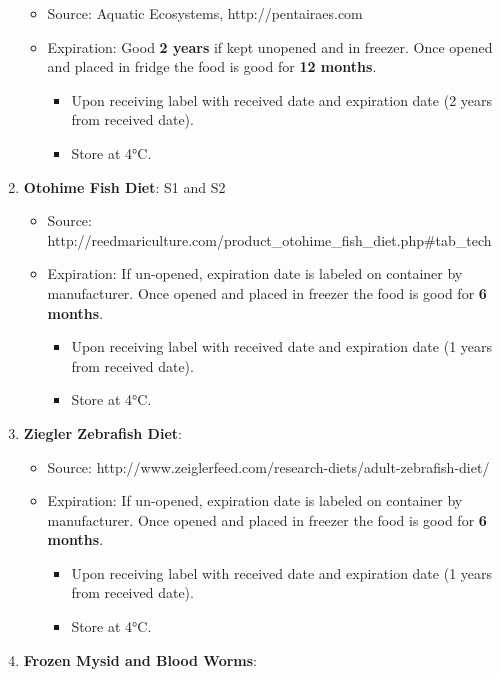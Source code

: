 \documentclass[
  letterpaper,
  DIV=11,
  numbers=noendperiod]{scrreprt}
\providecommand{\tightlist}{%
  \setlength{\itemsep}{0pt}\setlength{\parskip}{0pt}}\usepackage{longtable,booktabs,array}
\begin{document}
\begin{enumerate}
  \begin{itemize}
  \tightlist
  \item
    Source: Aquatic Ecosystems, http://pentairaes.com
  \item
    Expiration: Good \textbf{2 years} if kept unopened and in freezer.
    Once opened and placed in fridge the food is good for \textbf{12
    months}.

    \begin{itemize}
    \tightlist
    \item
      Upon receiving label with received date and expiration date (2
      years from received date).
    \item
      Store at 4°C.
    \end{itemize}
  \end{itemize}
\item
  \textbf{Otohime Fish Diet}: S1 and S2

  \begin{itemize}
  \tightlist
  \item
    Source:
    http://reedmariculture.com/product\_otohime\_fish\_diet.php\#tab\_tech
  \item
    Expiration: If un-opened, expiration date is labeled on container by
    manufacturer. Once opened and placed in freezer the food is good for
    \textbf{6 months}.

    \begin{itemize}
    \tightlist
    \item
      Upon receiving label with received date and expiration date (1
      years from received date).
    \item
      Store at 4°C.
    \end{itemize}
  \end{itemize}
\item
  \textbf{Ziegler Zebrafish Diet}:

  \begin{itemize}
  \tightlist
  \item
    Source:
    http://www.zeiglerfeed.com/research-diets/adult-zebrafish-diet/
  \item
    Expiration: If un-opened, expiration date is labeled on container by
    manufacturer. Once opened and placed in freezer the food is good for
    \textbf{6 months}.

    \begin{itemize}
    \tightlist
    \item
      Upon receiving label with received date and expiration date (1
      years from received date).
    \item
      Store at 4°C.
    \end{itemize}
  \end{itemize}
\item
  \textbf{Frozen Mysid and Blood Worms}:


\end{enumerate}
\end{document}
